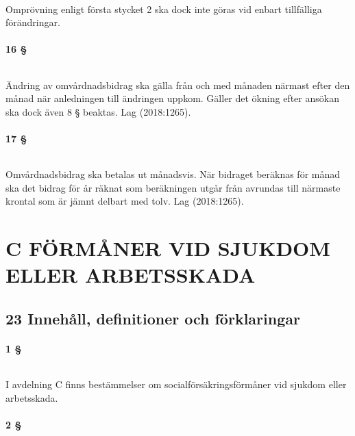 \documentclass[a4paper,notitlepage,openany,10pt]{book}
\begin{document}
\paragraph*{}
Omprövning enligt första stycket 2 ska dock inte göras vid enbart tillfälliga förändringar.
\subsection*{16 §}
\paragraph*{}
Ändring av omvårdnadsbidrag ska gälla från och med månaden närmast efter den månad när anledningen till ändringen uppkom. Gäller det ökning efter ansökan ska dock även 8 § beaktas.
Lag (2018:1265).
\subsection*{17 §}
\paragraph*{}
Omvårdnadsbidrag ska betalas ut månadsvis. När bidraget beräknas för månad ska det bidrag för år räknat som beräkningen utgår från avrundas till närmaste krontal som är jämnt delbart med tolv.
Lag (2018:1265).
\part*{C FÖRMÅNER VID SJUKDOM ELLER ARBETSSKADA}
\chapter*{23 Innehåll, definitioner och förklaringar}
\subsection*{1 §}
\paragraph*{}
I avdelning C finns bestämmelser om socialförsäkringsförmåner vid sjukdom eller arbetsskada.
\subsection*{2 §}
\end{document}
